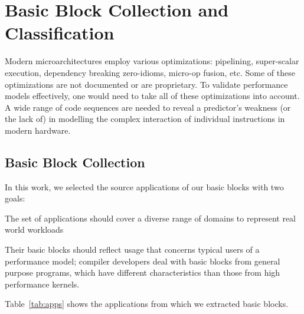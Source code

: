 \section{Basic Block Collection and Classification}
Modern microarchitectures employ various optimizations:
pipelining, super-scalar execution, dependency breaking zero-idioms, micro-op fusion, etc.
Some of these optimizations are not documented or are proprietary.
To validate performance models effectively, one would need to take
all of these optimizations into account.
A wide range of code sequences are needed to reveal a predictor's 
weakness (or the lack of) in modelling the complex interaction of 
individual instructions in modern hardware. 

\subsection{Basic Block Collection}
In this work, we selected the source applications of our basic blocks with two goals:
\begin{enumerate*}
    \item The set of applications should cover a diverse range
of domains to represent real world workloads
    \item Their basic blocks should reflect usage that concerns typical users of a performance model;
    compiler developers deal with
    basic blocks from general purpose programs,
    which have different characteristics
    than those from 
    high performance kernels. 
\end{enumerate*}
Table~\ref{tab:apps} shows the applications from which we extracted basic blocks.

